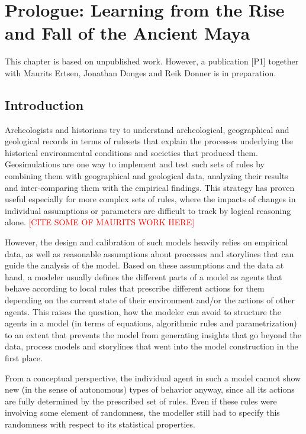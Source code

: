 \chapter{Prologue: Learning from the Rise and Fall of the Ancient Maya}
\label{chapter:maya}
This chapter is based on unpublished work. However, a publication [P1] together with Maurits Ertsen, Jonathan Donges and Reik Donner is in preparation.
\section{Introduction}

Archeologists and historians try to understand archeological, geographical and geological records in terms of rulesets that explain the processes underlying the historical environmental conditions and societies that produced them.
Geosimulations are one way to implement and test such sets of rules by combining them with geographical and geological data, analyzing their results and inter-comparing them with the empirical findings. This strategy has proven useful especially for more complex sets of rules, where the impacts of changes in individual assumptions or parameters are difficult to track by logical reasoning alone. \textcolor{red}{[CITE SOME OF MAURITS WORK HERE]}

However, the design and calibration of such models heavily relies on empirical data, as well as reasonable assumptions about processes and storylines that can guide the analysis of the model. Based on these assumptions and the data at hand, a modeler usually defines the different parts of a model as agents that behave according to local rules that prescribe different actions for them depending on the current state of their environment and/or the actions of other agents. This raises the question, how the modeler can avoid to structure the agents in a model (in terms of equations, algorithmic rules and parametrization) to an extent that prevents the model from generating insights that go beyond the data, process models and storylines that went into the model construction in the first place.

From a conceptual perspective, the individual agent in such a model cannot show new (in the sense of autonomous) types of behavior anyway, since all its actions are fully determined by the prescribed set of rules. Even if these rules were involving some element of randomness, the modeller still had to specify this randomness with respect to its statistical properties. 


